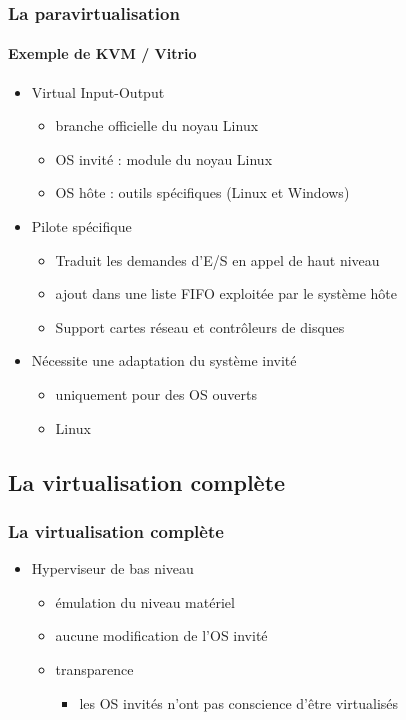 \begin{frame}
\frametitle{La paravirtualisation}
\framesubtitle{Exemple de KVM / Vitrio}
\begin{itemize}
\item Virtual Input-Output
\begin{itemize}
\item branche officielle du noyau Linux
\item OS invité : module du noyau Linux
\item OS hôte : outils spécifiques (Linux et Windows)
\end{itemize}
\item Pilote spécifique
\begin{itemize}
\item Traduit les demandes d'E/S en appel de haut niveau
\item ajout dans une liste FIFO exploitée par le système hôte
\item Support cartes réseau et contrôleurs de disques
\end{itemize}
\item Nécessite une adaptation du système invité
\begin{itemize}
\item uniquement pour des OS ouverts
\item Linux
\end{itemize}
\end{itemize}
\end{frame}


\subsection{La virtualisation complète}

\begin{frame}
\frametitle{La virtualisation complète}
\begin{itemize}
\item Hyperviseur de bas niveau
\begin{itemize}
\item émulation du niveau matériel
\item aucune modification de l'OS invité
\item transparence
\begin{itemize}
\item les OS invités n'ont pas conscience d'être virtualisés
\end{itemize}
\end{itemize}
\end{itemize}
\end{frame}


